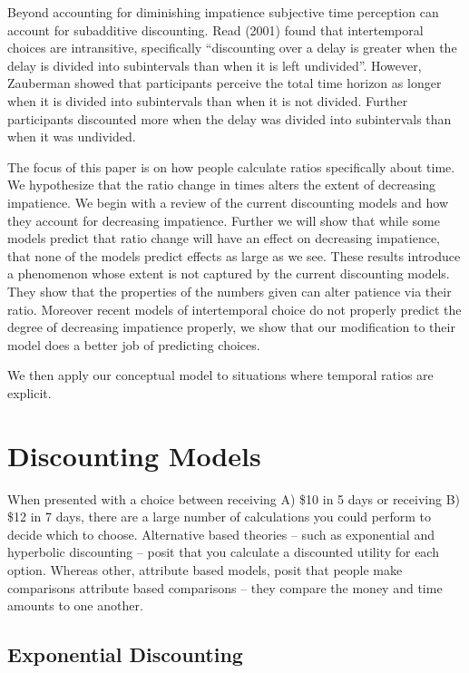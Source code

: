 \documentclass[]{article}
\begin{document}
Beyond accounting for diminishing impatience subjective time perception can account for subadditive discounting. 
Read (2001) found that intertemporal choices are intransitive, specifically “discounting over a delay is greater when the delay is divided into subintervals than when it is left undivided”. 
However, Zauberman showed that participants perceive the total time horizon as longer when it is divided into subintervals than when it is not divided. 
Further participants discounted more when the delay was divided into subintervals than when it was undivided. 

The focus of this paper is on how people calculate ratios specifically about time. 
We hypothesize that the ratio change in times alters the extent of decreasing impatience. 
We begin with a review of the current discounting models and how they account for decreasing impatience. 
Further we will show that while some models predict that ratio change will have an effect on decreasing impatience, that none of the models predict effects as large as we see. 
These results introduce a phenomenon whose extent is not captured by the current discounting models. 
They show that the properties of the numbers given can alter patience via their ratio. 
Moreover recent models of intertemporal choice do not properly predict the degree of decreasing impatience properly, we show that our modification to their model does a better job of predicting choices. 

We then apply our conceptual model to situations where temporal ratios are explicit. 


\section{Discounting Models}

When presented with a choice between receiving A) \$10 in 5 days or receiving B) \$12 in 7 days, there are a large number of calculations you could perform to decide which to choose.  Alternative based theories -- such as exponential and hyperbolic discounting -- posit that you calculate a discounted utility for each option. Whereas other, attribute based models, posit that people make comparisons attribute based comparisons -- they compare the money and time amounts to one another. 

\subsection{Exponential Discounting}
\end{document}
